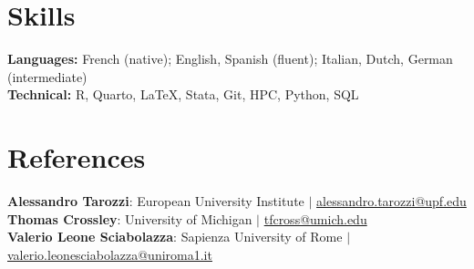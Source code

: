 \documentclass[12pt, a4paper]{article}
\begin{document}
%


\section{Skills}
 \begin{itemize}[leftmargin=0.5cm, label={}]
    \small{\item{
     \textbf{Languages:}{ French (native); English, Spanish (fluent); Italian, Dutch, German (intermediate)} \\
     \textbf{Technical:}{ R, Quarto, \LaTeX{}, Stata, Git, HPC, Python, SQL} 
    }}
 \end{itemize}
    

\section{References}
 \begin{itemize}[leftmargin=0.5cm, label={}]
    \small{\item{
     \textbf{Alessandro Tarozzi}{: European University Institute  $|$ \href{mailto:alessandro.tarozzi@upf.edu}{alessandro.tarozzi@upf.edu}} \\
     \textbf{Thomas Crossley}{:  University of Michigan $|$ \href{mailto:tfcross@umich.edu}{tfcross@umich.edu}}  \\
     \textbf{Valerio Leone Sciabolazza}{:  Sapienza University of Rome $|$ \href{mailto:valerio.leonesciabolazza@uniroma1.it}{valerio.leonesciabolazza@uniroma1.it}} 
    }} \\
    
 \end{itemize} 
    
  
\end{document}
